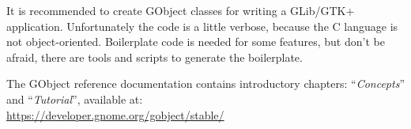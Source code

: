 It is recommended to create GObject classes for writing a GLib/GTK+ application. Unfortunately the code is a little verbose, because the C language is not object-oriented. Boilerplate code is needed for some features, but don't be afraid, there are tools and scripts to generate the boilerplate.

The GObject reference documentation contains introductory chapters: ``\emph{Concepts}'' and ``\emph{Tutorial}'', available at:\\
\url{https://developer.gnome.org/gobject/stable/}

